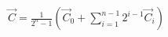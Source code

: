 \documentclass[preview]{standalone}
\begin{document}
\begin{align*}
\vec{C} = \frac{1}{2^n - 1}\left(\vec{C}_0 + \sum_{i=1}^{n-1} 2^{i-1}\vec{C}_i \right)
\end{align*}
\end{document}

